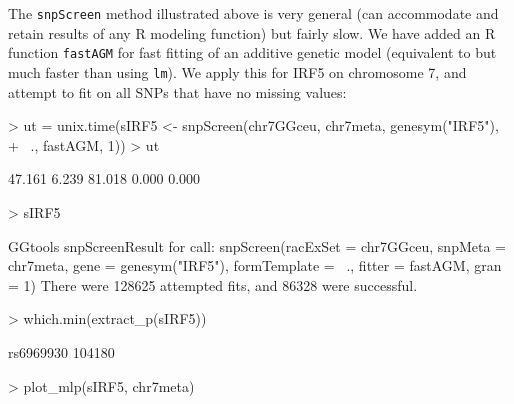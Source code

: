 \documentclass[12pt]{article}
\begin{document}
The \texttt{snpScreen} method illustrated above is very
general (can accommodate and retain results of any R modeling function)
but fairly slow.  We have added an R function \texttt{fastAGM}
for fast fitting of an additive genetic model (equivalent to
but much faster than using \texttt{lm}).  We apply this
for IRF5 on chromosome 7, and attempt to fit on all SNPs that
have no missing values:
\begin{Schunk}
\begin{Sinput}
> ut = unix.time(sIRF5 <- snpScreen(chr7GGceu, chr7meta, genesym("IRF5"), 
+     ~., fastAGM, 1))
> ut
\end{Sinput}
\begin{Soutput}
[1] 47.161  6.239 81.018  0.000  0.000
\end{Soutput}
\begin{Sinput}
> sIRF5
\end{Sinput}
\begin{Soutput}
GGtools snpScreenResult for call:
snpScreen(racExSet = chr7GGceu, snpMeta = chr7meta, gene = genesym("IRF5"), 
    formTemplate = ~., fitter = fastAGM, gran = 1)
There were 128625 attempted fits,
and 86328 were successful.
\end{Soutput}
\begin{Sinput}
> which.min(extract_p(sIRF5))
\end{Sinput}
\begin{Soutput}
rs6969930 
   104180 
\end{Soutput}
\end{Schunk}
\begin{Schunk}
\begin{Sinput}
> plot_mlp(sIRF5, chr7meta)
\end{Sinput}
\end{Schunk}
 
\end{document}
